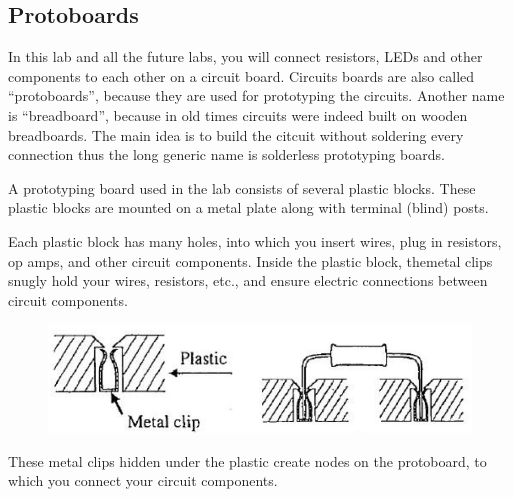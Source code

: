 \documentclass[12pt]{article}
\begin{document}
\subsection{Protoboards}
In this lab and all the future labs, you will connect resistors, LEDs and other components to each other on a circuit board. Circuits boards are also called “protoboards”, because they are used for prototyping the circuits. Another name is “breadboard”, because in old times circuits were indeed built on wooden breadboards. The main idea is to build the citcuit without soldering every connection thus the long generic name is solderless prototyping boards.
\par A prototyping board used in the lab consists of several plastic blocks. These plastic blocks are mounted on a metal plate along with terminal (blind) posts.
\par Each plastic block has many holes, into which you insert wires, plug in resistors, op amps, and other circuit components. Inside the plastic block, themetal clips snugly hold your wires, resistors, etc., and ensure electric connections between circuit components.
\begin{figure}[H]
\centering
\includegraphics[scale=0.5]{P3.jpg}
\end{figure}
\par These metal clips hidden under the plastic create nodes on the protoboard, to which you connect your circuit components.
\end{document}

